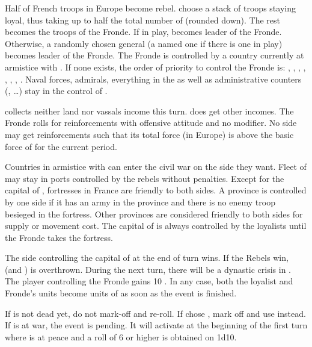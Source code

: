 
\phdipl
\aparag Half of French troops in Europe become rebel. \FRA choose a stack of
troops staying loyal, thus taking up to half the total number of \LD (rounded
down). The rest becomes the troops of the Fronde.
\bparag If in play, \leaderConde becomes leader of the Fronde. Otherwise, a
randomly chosen general (a named one if there is one in play) becomes leader
of the Fronde.
\aparag The Fronde is controlled by a country currently at armistice with
\FRA. If none exists, the order of priority to control the Fronde is: \HIS,
\ANG, \HOL, \AUS, \POL, \RUS, \SUE, \TUR.
\aparag Naval forces, admirals, everything in the \ROTW as well as
administrative counters (\MNU, \ldots) stay in the control of \FRA.

\phadm
\aparag \FRA collects neither land nor vassals income this turn. \FRA does get
other incomes.
\aparag The Fronde rolls for reinforcements with offensive attitude and no
modifier.
\aparag No side may get reinforcements such that its total force (in Europe)
is above the basic force of \FRA for the current period.

\phmil
\aparag Countries in armistice with \FRA can enter the civil war on the side
they want.
\aparag Fleet of \FRA may stay in ports controlled by the rebels without
penalties.
\aparag Except for the capital of \FRA, fortresses in France are friendly to
both sides.
\bparag A province is controlled by one side if it has an army in the province
and there is no enemy troop besieged in the fortress.
\bparag Other provinces are considered friendly to both sides for supply or
movement cost.
\aparag The capital of \FRA is always controlled by the loyalists until the
Fronde takes the fortress.

\phpaix
\aparag The side controlling the capital of \FRA at the end of turn wins.
\bparag If the Rebels win,  (and ) is
overthrown. During the next turn, there will be a dynastic crisis in \FRA. The
player controlling the Fronde gains 10 \VP.
\bparag In any case, both the loyalist and Fronde's units become units of \FRA
as soon as the event is finished.





\condition{}
\aparag If  is not dead yet, do not mark-off and re-roll.
\aparag If \RUS chose , mark off and use \RD
instead.
\aparag If \RUS is at war, the event is pending. It will activate at the
beginning of the first turn where \RUS is at peace and a roll of 6 or higher
is obtained on 1d10.

